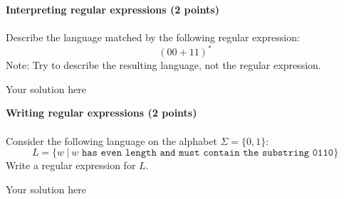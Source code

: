\documentclass[12pt]{article}
\newenvironment{question}[2][Question]{\begin{trivlist}
\item[\hskip \labelsep {\bfseries #1}\hskip \labelsep {\bfseries #2.}]}{\end{trivlist}}
\newenvironment{solution}[1][Solution:]{\begin{trivlist}
\item[\hskip \labelsep {\bfseries #1}\hskip \labelsep {\bfseries}]\color{blue}}{\end{trivlist}}
\begin{document}
    

\clearpage
\begin{question}{3}\textbf{Interpreting regular expressions (2 points)} \\\\

Describe the language matched by the following regular expression:
\[ (00 + 11 )^*\]
Note: Try to describe the resulting language, not the regular expression.
\end{question}

\begin{solution}
Your solution here
\end{solution}


\clearpage
\begin{question}{4}\textbf{Writing regular expressions (2 points)}\\\\
Consider the following language on the alphabet $\Sigma = \{0,1\}$:
\[L = \{w \ | \ w \texttt{ has even length and must contain the substring 0110}\}\]
Write a regular expression for $L$.
\end{question}

\begin{solution}
Your solution here
\end{solution}
\end{document}
